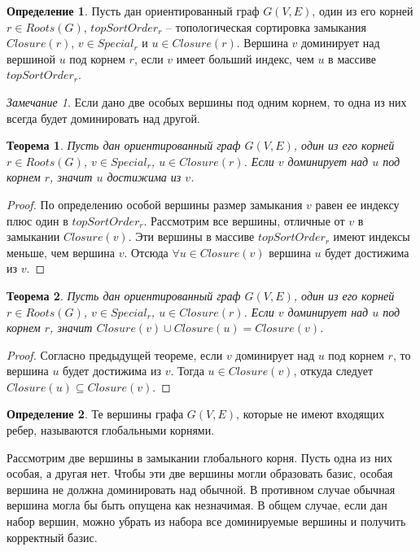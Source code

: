 \documentclass[12pt,a4paper,oneside,openany]{article}
\newtheorem{theorem}{Теорема}
\theoremstyle{definition}
\newtheorem{definition}{Определение}[]
\theoremstyle{lemma}
\theoremstyle{remark}
\newtheorem{remark}{Замечание}[]
\begin{document}
\begin{definition}
Пусть дан ориентированный граф $G(V,E)$, один из его корней $r \in Roots(G)$,
$topSortOrder_r$ -- топологическая сортировка замыкания $Closure(r)$, $v \in Special_r$ и $u \in Closure(r)$.
Вершина $v$ доминирует над вершиной $u$ под корнем $r$, если $v$ имеет больший индекс, чем $u$ в массиве $topSortOrder_r$.
\end{definition}

\begin{remark}
Если дано две особых вершины под одним корнем, то одна из них всегда будет доминировать над другой.
\end{remark}

\begin{theorem}
Пусть дан ориентированный граф $G(V,E)$, один из его корней $r \in Roots(G)$,
$v \in Special_r$, $u \in Closure(r)$. Если $v$ доминирует над $u$ под корнем $r$, значит $u$ достижима из $v$.
\end{theorem}

\begin{proof}
По определению особой вершины размер замыкания $v$ равен ее индексу плюс один в $topSortOrder_r$.
Рассмотрим все вершины, отличные от $v$ в замыкании $Closure(v)$.
Эти вершины в массиве $topSortOrder_r$ имеют индексы меньше, чем вершина $v$.
Отсюда $\forall u \in Closure(v)$ вершина $u$ будет достижима из $v$.
\end{proof}

\begin{theorem}
Пусть дан ориентированный граф $G(V,E)$, один из его корней $r \in Roots(G)$,
$v \in Special_r$, $u \in Closure(r)$.
Если $v$ доминирует над $u$ под корнем $r$, значит $Closure(v) \cup Closure(u) = Closure(v)$.
\end{theorem}

\begin{proof}
Согласно предыдущей теореме, если $v$ доминирует над $u$ под корнем $r$,
то вершина $u$ будет достижима из $v$.
Тогда $u \in Closure(v)$, откуда следует $Closure(u) \subseteq Closure(v)$.
\end{proof}

\begin{definition}
Те вершины графа $G(V,E)$, которые не имеют входящих ребер, называются глобальными корнями.
\end{definition}

Рассмотрим две вершины в замыкании глобального корня.
Пусть одна из них особая, а другая нет.
Чтобы эти две вершины могли образовать базис, особая вершина не должна доминировать над обычной.
В противном случае обычная вершина могла бы быть опущена как незначимая.
В общем случае, если дан набор вершин, можно убрать из набора все доминируемые вершины и получить корректный базис.
\end{document}
